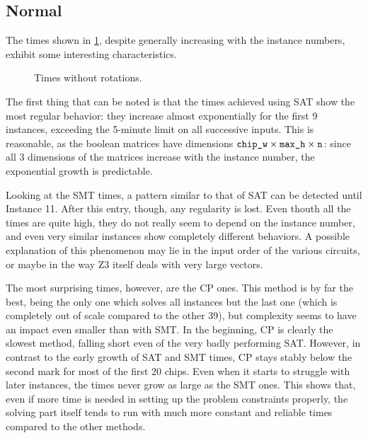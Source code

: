 \documentclass[a4paper, 12pt]{article}
\begin{document}
\subsection{Normal}\label{sec:res-normal}

The times shown in \cref{fig:normal}, despite generally increasing with the instance numbers, exhibit some interesting characteristics.

\begin{figure}
    \centering
    \caption{Times without rotations.}
    \label{fig:normal}
\end{figure}

The first thing that can be noted is that the times achieved using SAT show the most regular behavior: they increase almost exponentially for the first 9 instances, exceeding the 5-minute limit on all successive inputs. This is reasonable, as the boolean matrices have dimensions $\texttt{chip\symbol{95}w} \times \texttt{max\symbol{95}h} \times \texttt{n}$: since all 3 dimensions of the matrices increase with the instance number, the exponential growth is predictable.

Looking at the SMT times, a pattern similar to that of SAT can be detected until Instance 11. After this entry, though, any regularity is lost. Even thouth all the times are quite high, they do not really seem to depend on the instance number, and even very similar instances show completely different behaviors. A possible explanation of this phenomenon may lie in the input order of the various circuits, or maybe in the way Z3 itself deals with very large vectors.

The most surprising times, however, are the CP ones. This method is by far the best, being the only one which solves all instances but the last one (which is completely out of scale compared to the other 39), but complexity seems to have an impact even smaller than with SMT. In the beginning, CP is clearly the slowest method, falling short even of the very badly performing SAT. However, in contrast to the early growth of SAT and SMT times, CP stays stably below the second mark for most of the first 20 chips. Even when it starts to struggle with later instances, the times never grow as large as the SMT ones. This shows that, even if more time is needed in setting up the problem constraints properly, the solving part itself tends to run with much more constant and reliable times compared to the other methods.
\end{document}
